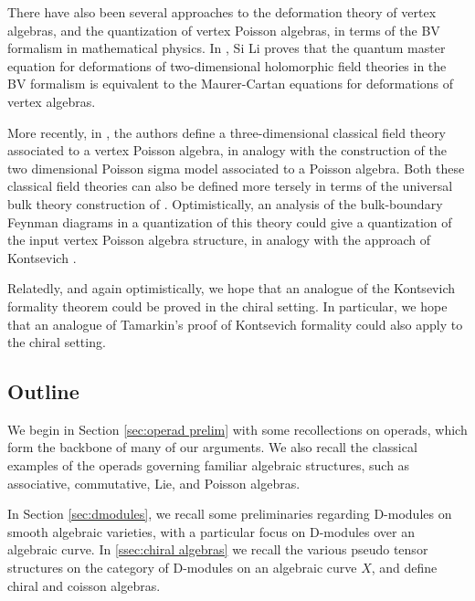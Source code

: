\documentclass[11pt]{amsart}
\numberwithin{equation}{section}
\theoremstyle{definition}
\newcommand{\0}{{\textbf{0}}}
\def\IA{\mathbb{A}}
\begin{document}
There have also been several approaches to the deformation theory of vertex algebras, and the quantization of vertex Poisson algebras, in terms of the BV formalism in mathematical physics. In \cite{Li2016}, Si Li proves that the quantum master equation for deformations of two-dimensional holomorphic field theories in the BV formalism is equivalent to the Maurer-Cartan equations for deformations of vertex algebras.

More recently, in \cite{Khan:2025rah}, the authors define a three-dimensional classical field theory associated to a vertex Poisson algebra, in analogy with the construction of the two dimensional Poisson sigma model associated to a Poisson algebra. Both these classical field theories can also be defined more tersely in terms of the universal bulk theory construction of \cite{ButsonYoo}. Optimistically, an analysis of the bulk-boundary Feynman diagrams in a quantization of this theory could give a quantization of the input vertex Poisson algebra structure, in analogy with the approach of Kontsevich \cite{Kontsevich1997}. 

Relatedly, and again optimistically, we hope that an analogue of the Kontsevich formality theorem could be proved in the chiral setting. In particular, we hope that an analogue of Tamarkin's proof of Kontsevich formality \cite{Tamarkin, Hinich} could also apply to the chiral setting.





\subsection{Outline}

We begin in Section \ref{sec:operad prelim} with some recollections on operads, which form the backbone of many of our arguments. We also recall the classical examples of the operads governing familiar algebraic structures, such as associative, commutative, Lie, and Poisson algebras.

In Section \ref{sec:dmodules}, we recall some preliminaries regarding D-modules on smooth algebraic varieties, with a particular focus on D-modules over an algebraic curve. In \ref{ssec:chiral algebras} we recall the various pseudo tensor structures on the category of D-modules on an algebraic curve $X$, and define chiral and coisson algebras.
\end{document}
